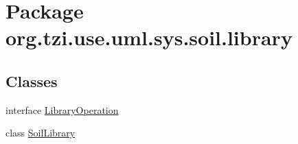 \hypertarget{namespaceorg_1_1tzi_1_1use_1_1uml_1_1sys_1_1soil_1_1library}{\section{Package org.\-tzi.\-use.\-uml.\-sys.\-soil.\-library}
\label{namespaceorg_1_1tzi_1_1use_1_1uml_1_1sys_1_1soil_1_1library}
}
\subsection*{Classes}
\begin{DoxyCompactItemize}
\item 
interface \hyperlink{interfaceorg_1_1tzi_1_1use_1_1uml_1_1sys_1_1soil_1_1library_1_1_library_operation}{Library\-Operation}
\item 
class \hyperlink{classorg_1_1tzi_1_1use_1_1uml_1_1sys_1_1soil_1_1library_1_1_soil_library}{Soil\-Library}
\end{DoxyCompactItemize}
